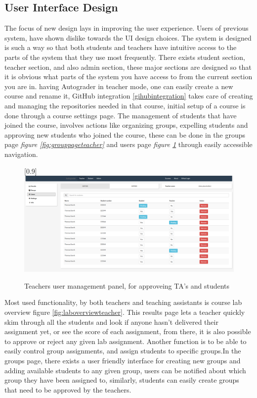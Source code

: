 \subsection{User Interface Design}
The focus of new design lays in improving the user experience. Users of previous system, have shown dislike towards the UI design choices. The system is designed is such a way so that both students and teachers have intuitive access to the parts of the system that they use most frequently. There exists student section, teacher section, and also admin section, these major sections are designed so that it is obvious what parts of the system you have access to from the current section you are in. having Autograder in teacher mode, one can easily create a new course and rename it, GitHub integration \ref{gihubintegration} takes care of creating and managing the repositories needed in that course, initial setup of a course is done through a course settings page. The management of students that have joined the course, involves actions like organizing groups, expelling students and approving new students who joined the course, these can be done in the groups page \emph{figure \ref{fig:grouppageteacher}} and users page \emph{figure \ref{fig:teacherpage}} through easily accessible navigation.
\begin{figure}[h]
 \scalebox{1}[0.9]{{\includegraphics[width=1\linewidth]{graphs/teacher.png}}}
  \caption{Teachers user management panel, for approveing TA's and students}
  \label{fig:teacherpage}
\end{figure}
Most used functionality, by both teachers and teaching assistants is course lab overview figure \ref{fig:laboverviewteacher}. This results page lets a teacher quickly skim through all the students and look if anyone hasn't delivered their assignment yet, or see the score of each assignment, from there, it is also possible to approve or reject any given lab assignment. Another function is to be able to easily control group assignments, and assign students to specific groups.In the groups page, there exists a user friendly interface for creating new groups and adding available students to any given group, users can be notified about which group they have been assigned to, similarly, students can easily create groups that need to be approved by the teachers.
